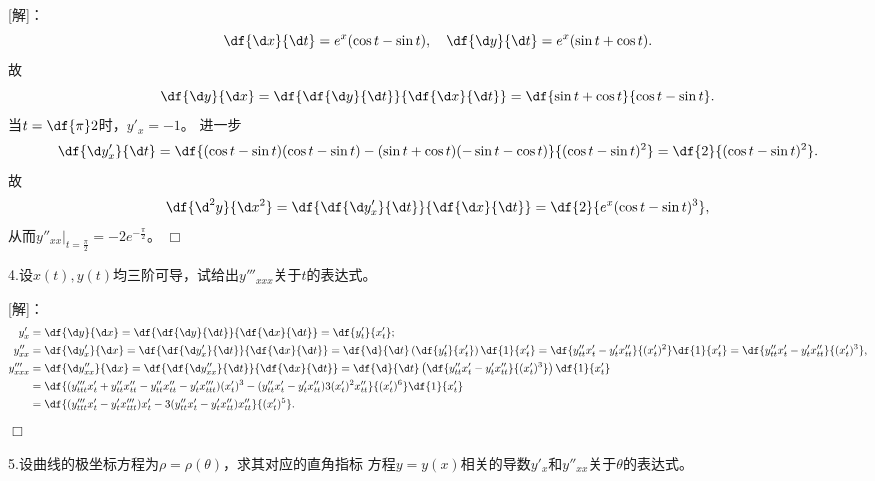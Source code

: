 [解]：
$$\df{\d x}{\d t}=e^x(\cos t-\sin t),\quad
\df{\d y}{\d t}=e^x(\sin t+\cos t).$$
故
$$\df{\d y}{\d x}=\df{\df{\d y}{\d t}}{\df{\d x}{\d t}}
=\df{\sin t+\cos t}{\cos t-\sin t}.$$
当$t=\df{\pi}2$时，$y'_x=-1$。
进一步
$$\df{\d y'_x}{\d t}=\df{(\cos t-\sin t)(\cos t-\sin t)
-(\sin t+\cos t)(-\sin t-\cos t)}{(\cos t-\sin t)^2}
=\df{2}{(\cos t-\sin t)^2}.$$
故
$$\df{\d^2 y}{\d x^2}
=\df{\df{\d y'_x}{\d t}}{\df{\d x}{\d t}}
=\df{2}{e^x(\cos t-\sin t)^3},$$
从而$y''_{xx}|_{t=\frac{\pi}2}=-2e^{-\frac{\pi}2}$。
\hfill$\Box$

\bigskip

4.设$x(t),y(t)$均三阶可导，试给出$y'''_{xxx}$关于$t$的表达式。

[解]：
\begin{align*}
	y'_x&=\df{\d y}{\d x}=\df{\df{\d y}{\d t}}{\df{\d x}{\d t}}
	=\df{y'_t}{x'_t};\\
	y''_{xx}&=\df{\d y'_x}{\d x}=\df{\df{\d y'_x}{\d t}}{\df{\d x}{\d t}}
	=\df{\d }{\d t}\left(\df{y'_t}{x'_t}\right)\df{1}{x'_t}
	=\df{y''_{tt}x'_t-y'_tx''_{tt}}{(x'_t)^2}\df{1}{x'_t}
	=\df{y''_{tt}x'_t-y'_tx''_{tt}}{(x'_t)^3},\\
	y'''_{xxx}&=\df{\d y''_{xx}}{\d x}=\df{\df{\d y''_{xx}}{\d t}}{\df{\d x}{\d t}}
	=\df{\d }{\d t}\left(\df{y''_{tt}x'_t-y'_tx''_{tt}}{(x'_t)^3}\right)
	\df{1}{x'_t}\\
	&=\df{(y'''_{ttt}x'_t+y''_{tt}x''_{tt}
	-y''_{tt}x''_{tt}-y'_tx'''_{ttt})(x'_t)^3
	-(y''_{tt}x'_t-y'_tx''_{tt})3(x'_t)^2x''_{tt}}{(x'_t)^6}\df{1}{x'_t}\\
	&=\df{(y'''_{ttt}x'_t-y'_tx'''_{ttt})x'_t
	-3(y''_{tt}x'_t-y'_tx''_{tt})x''_{tt}}{(x'_t)^5}.
\end{align*}
\hfill$\Box$

\bigskip

5.设曲线的极坐标方程为$\rho=\rho(\theta)$，求其对应的直角指标
方程$y=y(x)$相关的导数$y'_x$和$y''_{xx}$关于$\theta$的表达式。

